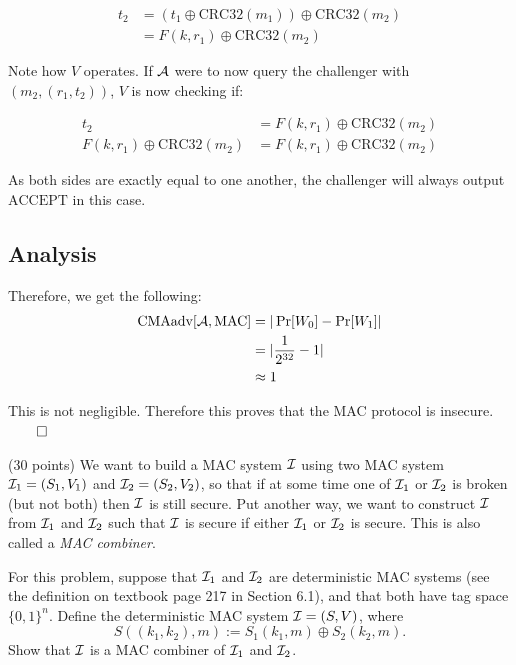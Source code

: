 \documentclass[12pt]{article}
\begin{document}
\begin{solution}
\begin{equation*}
    \begin{aligned}
        t_2 &= (t_1 \oplus \text{CRC32}(m_1)) \oplus \text{CRC32}(m_2)\\
        &= F(k, r_1) \oplus \text{CRC32}(m_2)
    \end{aligned}
\end{equation*}

\noindent Note how $V$ operates. If $\mathcal{A}$ were to now query the challenger with $(m_2, (r_1, t_2))$, $V$ is now checking if:

\begin{equation*}
    \begin{aligned}
        t_2 &= F(k, r_1) \oplus \text{CRC32}(m_2)\\
        F(k, r_1) \oplus \text{CRC32}(m_2) &= F(k, r_1) \oplus \text{CRC32}(m_2)
    \end{aligned}
\end{equation*}

\noindent As both sides are exactly equal to one another, the challenger will always output $\text{ACCEPT}$ in this case.

\subsection*{Analysis}
Therefore, we get the following:
\begin{equation*}
    \begin{aligned}
        \text{CMAadv}[\mathcal{A}, \text{MAC}] &= |\Pr[W_0] - \Pr[W_1]|\\
        &= |\frac{1}{2^{32}} - 1|\\
        &\approx 1
    \end{aligned}
\end{equation*}

\noindent This is not negligible. Therefore this proves that the MAC protocol is insecure. $\qed$
\end{solution}
  
  
\begin{problem} (30 points)
We want to build a MAC system $\mathcal{I}$ using two MAC system $\mathcal{I}_1 = (S_1, V_1)$ and $\mathcal{I}_2 = (S_2, V_2)$, so that if at some time one of $\mathcal{I}_1$ or $\mathcal{I}_2$ is broken (but not both) then $\mathcal{I}$ is still secure.
Put another way, we want to construct $\mathcal{I}$ from $\mathcal{I}_1$ and $\mathcal{I}_2$ such that $\mathcal{I}$ is secure if either $\mathcal{I}_1$ or $\mathcal{I}_2$ is secure.
This is also called a \emph{MAC combiner}.

For this problem, suppose that $\mathcal{I}_1$ and $\mathcal{I}_2$ are deterministic MAC systems (see the definition on textbook page 217 in Section 6.1), and that both have tag space $\{0, 1\}^n$.
Define the deterministic MAC system $\mathcal{I} = (S, V)$, where
\[
	S((k_1, k_2), m) := S_1(k_1, m) \oplus S_2(k_2, m).
\]
Show that $\mathcal{I}$ is a MAC combiner of $\mathcal{I}_1$ and $\mathcal{I}_2$.
\end{problem} 
  
\end{document}
